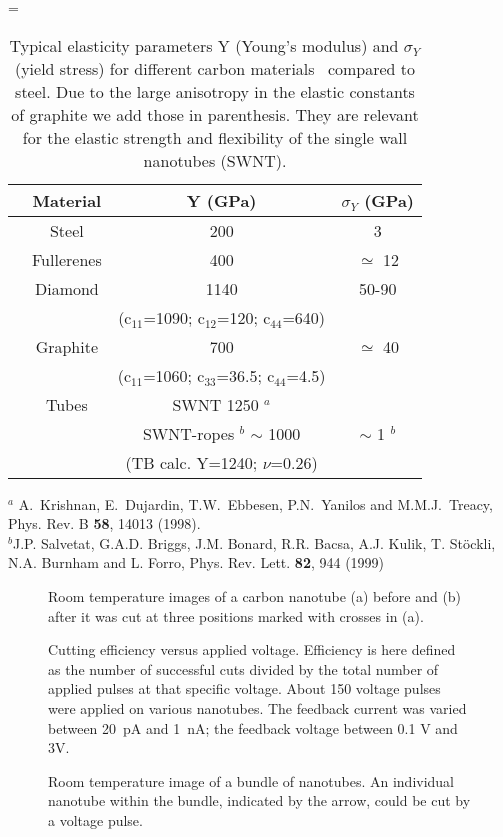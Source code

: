 \begin{multicols}{2}
 = \hbox{\cite{book1}}
\begin{table}
\caption{Typical elasticity parameters Y (Young's modulus) and $\sigma_{Y}$ (yield stress) for different carbon materials~ compared to steel. Due to the large anisotropy in the elastic constants of graphite we add those in parenthesis. They are relevant for the elastic strength and flexibility of the single wall nanotubes (SWNT).}
\begin{tabular}{c|c|c|c|}
& Material & Y (GPa) & $\sigma_{Y}$ (GPa) \\ \hline
& Steel & 200 & 3 \\
& Fullerenes & 400 & $\simeq$ 12 \\
& Diamond & 1140 & 50-90 \\
& & (c$_{11}$=1090; c$_{12}$=120; c$_{44}$=640) & \\
& Graphite & 700 & $\simeq$ 40 \\
& & (c$_{11}$=1060; c$_{33}$=36.5; c$_{44}$=4.5) & \\
& Tubes & SWNT 1250 $^a$ & \\
& & SWNT-ropes $^b$ $\sim$ 1000 & $\sim$ 1 $^b$ \\
& & (TB calc. Y=1240; $\nu$=0.26)\cite{Hernandez} & \\
\end{tabular}
$^a$ A.~Krishnan, E.~Dujardin, T.W.~Ebbesen,
P.N.~Yanilos and M.M.J.~Treacy, Phys. Rev. B {\bf 58}, 14013 (1998).\\
$^b$J.P. Salvetat, G.A.D. Briggs, J.M. Bonard, R.R. Bacsa,
A.J. Kulik, T. St\"{o}ckli, N.A. Burnham and L. Forro, Phys. Rev.
Lett. {\bf 82}, 944 (1999)
\end{table}

\begin{figure}
\caption[]{ Room temperature images of a carbon nanotube (a) before and (b) after it was cut at three positions marked with crosses in (a).}
\end{figure}

\begin{figure}
\caption[]{Cutting efficiency versus applied voltage. Efficiency is here defined as the number of successful cuts divided by the total number of applied pulses at that specific voltage. About 150 voltage pulses were applied on various nanotubes. The feedback current was varied between 20~pA and 1~nA; the feedback voltage between 0.1 V and 3V.}
\end{figure}

\begin{figure}
\caption[]{ Room temperature image of a bundle of nanotubes. An individual nanotube within the bundle, indicated by the arrow, could be cut by a voltage pulse.}
\end{figure}


\end{multicols}
